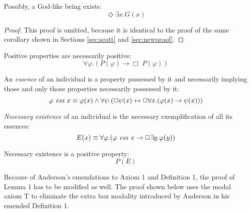 \documentclass[smallextended]{svjour3}
\newcommand{\imp}{\rightarrow}
\newcommand{\biimp}{\leftrightarrow}
\newcommand{\all}{\forall}
\newcommand{\ex}{\exists}
\newcommand{\nec}{\Box} %
\newcommand{\pos}{\Diamond} %
\begin{document}
\begin{corollary}
\label{A:C1}
Possibly, a God-like being exists:
$$
\pos \ex x. G(x)
$$
\end{corollary}
\begin{proof}
This proof is omitted, because it is identical to the proof of the same corollary shown in Sections \ref{sec:scott} and \ref{sec:newproof}.
\end{proof}




\begin{axiom}[As in Scott's]
\label{A:A4}
Positive properties are necessarily positive:
$$
\all \varphi.(P(\varphi) \to \Box \; P(\varphi))
$$
\end{axiom}

\begin{definition}[Emended]
\label{A:D2}
An \emph{essence} of an individual is a property possessed by it and necessarily implying those and only those properties necessarily possessed by it:
$$
\ess{\varphi}{x} \equiv \varphi(x) \wedge \all \psi. (\nec \psi(x) \biimp \nec \all x. (\varphi(x) \imp \psi(x)))
$$
\end{definition}



\begin{definition}[As in Scott's]
\label{A:D3}
\emph{Necessary existence} of an individual is the necessary exemplification of all its essences:
$$
E(x) \equiv \all \varphi.(\ess{\varphi}{x} \imp \nec \ex y.\varphi(y))
$$
\end{definition}


\begin{axiom}[As in Scott's]
\label{A:A5}
Necessary existence is a positive property:
$$
P(E)
$$
\end{axiom}


Because of Anderson's emendations to Axiom 1 and Definition 1, the proof of Lemma 1 has to be modified as well. The proof shown below uses the modal axiom T to eliminate the extra box modality introduced by Anderson
in his emended Definition 1.
\end{document}
